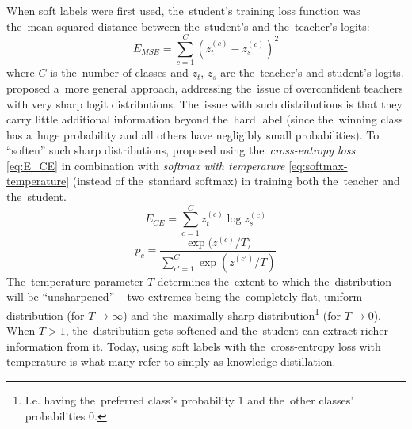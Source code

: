 \documentclass[bsc,frontabs,singlespacing,parskip,deptreport]{infthesis}
\begin{document}
{{{      When soft labels were first used, the~student's training loss function was the~mean squared distance between the~student's and the~teacher's logits:
      \begin{equation}
        E_{MSE}=\sum_{c=1}^{C}{(z_t^{(c)}-z_s^{(c)})^2}
        \label{eq:E_MSE}        
      \end{equation}
      where $C$ is the~number of classes and $z_t$, $z_s$ are the~teacher's and student's logits.
      \citet{Hinton_2015} proposed a~more general approach, addressing the~issue of overconfident teachers with very sharp logit distributions. The~issue with such distributions is that they carry little additional information beyond the~hard label (since the~winning class has a~huge probability and all others have negligibly small probabilities).
      To ``soften'' such sharp distributions, \citeauthor{Hinton_2015} proposed using the~\textit{cross-entropy loss} \autoref{eq:E_CE} in combination with \textit{softmax with temperature} \autoref{eq:softmax-temperature} (instead of the~standard softmax) in training both the~teacher and the~student.
      \begin{equation}
        E_{CE}=\sum_{c=1}^{C}{z_t^{(c)} \log{z_s^{(c)}}}
        \label{eq:E_CE}        
      \end{equation}
      \begin{equation}
        p_c=\frac{\exp{(z^{(c)}/T})}{\sum_{c'=1}^{C}{\exp{(z^{(c')}/T)}}}
        \label{eq:softmax-temperature}        
      \end{equation}
      The~temperature parameter $T$ determines the~extent to which the~distribution will be ``unsharpened'' -- two extremes being the~completely flat, uniform distribution (for $T \rightarrow \infty$) and the~maximally sharp distribution\footnote{I.e. having the~preferred class's probability 1 and the~other classes' probabilities 0.} (for $T \rightarrow 0$). When $T > 1$, the~distribution gets softened and the~student can extract richer information from it. Today, using soft labels with the~cross-entropy loss with temperature is what many refer to simply as knowledge distillation.

}}}
\end{document}
